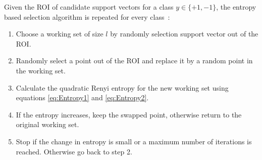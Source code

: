\documentclass[preprint,12pt]{elsarticle}
\newtheorem*{remark}{Remark}
\begin{document}
	
	
	Given the ROI of candidate support vectors for a class $y \in \{+1,-1\}$, the entropy based selection algorithm is repeated for every class~\cite{suykens2002least}:
	\begin{enumerate}
		\item Choose a working set of size $l$ by randomly selection support vector out of the ROI.
		\item Randomly select a point out of the ROI and replace it by a random point in the working set.
		\item Calculate the quadratic Renyi entropy for the new working set using equations \eqref{eq:Entropy1} and \eqref{eq:Entropy2}.
		\item If the entropy increases, keep the swapped point, otherwise return to the original working set.
		\item Stop if the change in entropy is small or a maximum number of iterations is reached. Otherwise go back to step 2.
	\end{enumerate}
		
\end{document}
